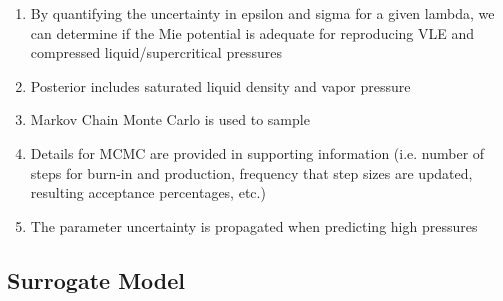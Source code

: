 \documentclass[preprint,letterpaper,floatfix,citeautoscript,aip,jcp]{revtex4-1}
\begin{document}
\begin{enumerate}
	\item By quantifying the uncertainty in epsilon and sigma for a given lambda, we can determine if the Mie potential is adequate for reproducing VLE and compressed liquid/supercritical pressures
	\item Posterior includes saturated liquid density and vapor pressure
	\item Markov Chain Monte Carlo is used to sample %
	\item Details for MCMC are provided in supporting information (i.e. number of steps for burn-in and production, frequency that step sizes are updated, resulting acceptance percentages, etc.)
	\item The parameter uncertainty is propagated when predicting high pressures
\end{enumerate}

\subsection{Surrogate Model}
\end{document}
